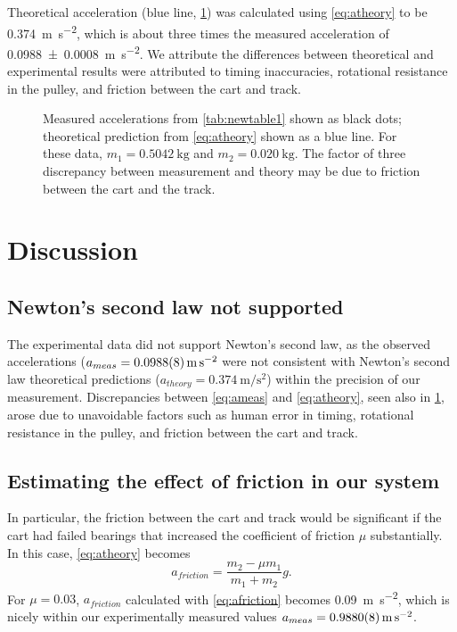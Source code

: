 \documentclass[reprint,amsmath,amssymb,aps]{revtex4-2}
\begin{document}
Theoretical acceleration (blue line, \cref{fig:results}) was calculated using \cref{eq:atheory} to be \qty{0.374}{\meter\per\second\squared}, which is about three times the measured acceleration of \qty{0.0988\pm0.0008}{\meter\per\second\squared}. We attribute the differences between theoretical and experimental results were attributed to timing inaccuracies, rotational resistance in the pulley, and friction between the cart and track.
\begin{figure}
\begin{center}

\end{center}
\caption{\label{fig:results} Measured accelerations from \cref{tab:newtable1} shown as black dots; theoretical prediction from \cref{eq:atheory} shown as a blue line. For these data, $m_1=\qty{0.5042}{\kilo\gram}$ and $m_2=\qty{0.020}{\kilo\gram}$. The factor of three discrepancy between measurement and theory may be due to friction between the cart and the track.} 
\end{figure}





\section{Discussion}
\subsection{Newton's second law not supported}
The experimental data did not support Newton’s second law, as the observed accelerations ($a_{meas}=\qty{0.0988\pm0.0008}{\meter\per\second\squared}$ were not consistent with Newton's second law theoretical predictions ($a_{theory}=\qty{0.374}{\meter\per\second\squared}$) within the precision of our measurement. Discrepancies between \cref{eq:ameas} and \cref{eq:atheory}, seen also in \cref{fig:results}, arose due to unavoidable factors such as human error in timing, rotational resistance in the pulley, and friction between the cart and track.

\subsection{Estimating the effect of friction in our system}
In particular, the friction between the cart and track would be significant if the cart had failed bearings that increased the coefficient of friction $\mu$ substantially. In this case, \cref{eq:atheory} becomes
\begin{equation}
a_{friction} = \dfrac{m_2 - \mu m_1}{m_1 + m_2} g.
\label{eq:afriction}
\end{equation}
For $\mu=0.03$, $a_{friction}$ calculated with \cref{eq:afriction} becomes \qty{0.09}{\meter\per\second\squared}, which is nicely within our experimentally measured values $a_{meas}=\qty{0.988\pm0.0008}{\meter\per\second\squared}$. 
\end{document}
